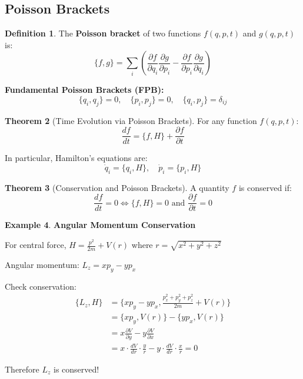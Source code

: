 \documentclass[12pt,a4paper]{article}
\theoremstyle{definition}
\newtheorem{theorem}{Theorem}[section]
\newtheorem{definition}[theorem]{Definition}
\newtheorem{example}[theorem]{Example}
\begin{document}
\subsection{Poisson Brackets}

\begin{definition}
The \textbf{Poisson bracket} of two functions $f(q, p, t)$ and $g(q, p, t)$ is:
\[
\{f, g\} = \sum_i \left(\frac{\partial f}{\partial q_i}\frac{\partial g}{\partial p_i} - \frac{\partial f}{\partial p_i}\frac{\partial g}{\partial q_i}\right)
\]
\end{definition}

\begin{importantbox}
\textbf{Fundamental Poisson Brackets (FPB):}
\[
\{q_i, q_j\} = 0, \quad \{p_i, p_j\} = 0, \quad \{q_i, p_j\} = \delta_{ij}
\]
\end{importantbox}

\begin{theorem}[Time Evolution via Poisson Brackets]
For any function $f(q, p, t)$:
\[
\frac{df}{dt} = \{f, H\} + \frac{\partial f}{\partial t}
\]

In particular, Hamilton's equations are:
\[
\dot{q}_i = \{q_i, H\}, \quad \dot{p}_i = \{p_i, H\}
\]
\end{theorem}

\begin{theorem}[Conservation and Poisson Brackets]
A quantity $f$ is conserved if:
\[
\frac{df}{dt} = 0 \iff \{f, H\} = 0 \text{ and } \frac{\partial f}{\partial t} = 0
\]
\end{theorem}

\begin{example}
\textbf{Angular Momentum Conservation}

For central force, $H = \frac{p^2}{2m} + V(r)$ where $r = \sqrt{x^2 + y^2 + z^2}$

Angular momentum: $L_z = xp_y - yp_x$

Check conservation:
\begin{align*}
\{L_z, H\} &= \{xp_y - yp_x, \frac{p_x^2 + p_y^2 + p_z^2}{2m} + V(r)\} \\
&= \{xp_y, V(r)\} - \{yp_x, V(r)\} \\
&= x\frac{\partial V}{\partial y} - y\frac{\partial V}{\partial x} \\
&= x \cdot \frac{dV}{dr} \cdot \frac{y}{r} - y \cdot \frac{dV}{dr} \cdot \frac{x}{r} = 0
\end{align*}

Therefore $L_z$ is conserved!
\end{example}
\end{document}
